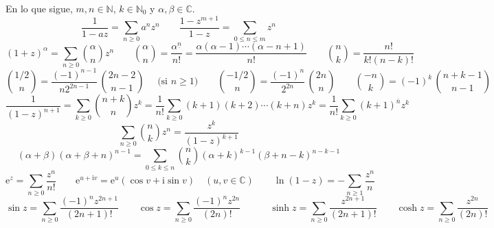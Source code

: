 \documentclass[fleqn, spanish]{article}
\begin{document}
  En lo que sigue,
  \(m, n \in \mathbb{N}\),
  \(k \in \mathbb{N}_0\)
  y \(\alpha, \beta \in \mathbb{C}\).
  \begin{equation*}
    \frac{1}{1 - a z}
      = \sum_{n \ge 0} a^n z^n
	 \qquad \frac{1 - z^{m + 1}}{1 - z}
	    = \sum_{0 \le n \le m} z^n
  \end{equation*}
  \begin{equation*}
    (1 + z)^\alpha
      = \sum_{n \ge 0} \binom{\alpha}{n} z^n
	 \qquad \binom{\alpha}{n}
	     = \frac{\alpha^{\underline{n}}}{n!}
	     = \frac{\alpha (\alpha - 1) \dotsm (\alpha - n + 1)}{n!}
	 \qquad
    \binom{n}{k}
	     = \frac{n!}{k! (n - k)!}
  \end{equation*}
  \begin{equation*}
    \binom{1/2}{n}
      = \frac{(-1)^{n - 1}}{n 2^{2 n - 1}} \, \binom{2 n - 2}{n - 1}
	    \quad \text{\ (si \(n \ge 1\))}
      \qquad
    \binom{-1/2}{n}
      = \frac{(-1)^n}{2^{2 n}} \, \binom{2 n}{n} \qquad
    \binom{-n}{k}
      = (-1)^k \, \binom{n + k - 1}{n - 1}
  \end{equation*}
  \begin{equation*}
    \frac{1}{(1 - z)^{n + 1}}
      = \sum_{k \ge 0} \binom{n + k}{n} z^k
      = \frac{1}{n!}
	   \sum_{k \ge 0} (k + 1) (k + 2) \dotsm (k + n) z^k
      = \frac{1}{n!} \sum_{k \ge 0} (k + 1)^{\bar{n}} z^k
  \end{equation*}
  \begin{equation*}
    \sum_{n \ge 0} \binom{n}{k} z^n
      = \frac{z^k}{(1 - z)^{k + 1}}
  \end{equation*}
  \begin{equation*}
    (\alpha + \beta) (\alpha + \beta + n)^{n - 1}
      = \sum_{0 \le k \le n}
	  \binom{n}{k}
	    (\alpha + k)^{k - 1}
	    (\beta + n - k)^{n - k - 1}
  \end{equation*}
  \begin{equation*}
    \mathrm{e}^z
      = \sum_{n \ge 0} \frac{z^n}{n!}
      \qquad
    \mathrm{e}^{u + \mathrm{i} v}
      = \mathrm{e}^u (\cos v + \mathrm{i} \sin v)
      \quad (u, v \in \mathbb{C})
      \qquad
    \ln (1 - z)
      = - \sum_{n \ge 1} \frac{z^n}{n}
  \end{equation*}
  \begin{equation*}
    \sin z = \sum_{n \ge 0} \frac{(-1)^n z^{2 n + 1}}{(2 n + 1)!}
      \qquad
    \cos z = \sum_{n \ge 0} \frac{(-1)^n z^{2 n}}{(2 n)!}
      \hspace{3em}
    \sinh z = \sum_{n \ge 0} \frac{z^{2 n + 1}}{(2 n + 1)!}
      \qquad
    \cosh z = \sum_{n \ge 0} \frac{z^{2 n}}{(2 n)!}
  \end{equation*}
\end{document}
